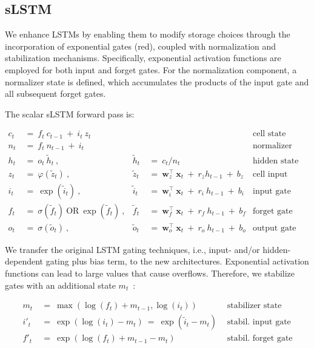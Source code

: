\subsection{sLSTM}
\label{sec:sLSTM}

We enhance LSTMs by enabling them to modify storage choices through the incorporation of exponential gates (red), coupled with normalization and stabilization mechanisms. Specifically, exponential activation functions are employed for both input and forget gates. For the normalization component, a normalizer state is defined, which accumulates the products of the input gate and all subsequent forget gates.

The scalar sLSTM forward pass is:

\begin{align}
\label{eq:slstmforward}
c_t \ &= \  f_t \ c_{t-1} \ + \ i_t \ z_t & & 
 &\text{cell state} \\
n_t \ &= \  f_t \ n_{t-1} \ + \ i_t  & & 
 &\text{normalizer state} \\
h_t \ &= \ o_t \ \tilde{h}_t \ ,
  &\tilde{h}_t \ &= \ c_t / n_t
&\text{hidden state} \\
z_t \ &= \ \varphi \left( \tilde{z}_t \right) \ , 
  &\tilde{z}_t \ &=  \ \mathbf{w}^\top_{z} \ \mathbf{x}_t \ + \
  r_{z}  h_{t-1} \ + \  b_{z}
  &\text{cell input} \\
i_t \ &= \ \!\exp \left( \tilde{i}_t  \right) \ , 
  &\tilde{i}_t \ &= \ \mathbf{w}^\top_{i} \ \mathbf{x}_t \ + \
  r_{i}  \ h_{t-1} \ + \  b_{i}
  &\text{input gate} \\
f_t \ &= \ \sigma \left(  \tilde{f}_t \right) \ \text{OR} \
\!\exp \left(  \tilde{f}_t \right) \ ,
  &\tilde{f}_t \ &= \ \mathbf{w}^\top_{f} \ \mathbf{x}_t  \ + \
  r_{f}  \ h_{t-1} \ + \  b_{f}
  &\text{forget gate} \\
o_t \ &= \ \sigma \left( \tilde{o}_t \right) \ , 
  &\tilde{o}_t  \ &= \ \mathbf{w}^\top_{o} \ \mathbf{x}_t \ + \
  r_{o}  \ h_{t-1} \ + \  b_{o}
  &\text{output gate} 
\end{align}

We transfer the original LSTM gating techniques, i.e., input- and/or hidden-dependent gating plus bias term, to the new architectures. Exponential activation functions can lead to large values that cause overflows. Therefore, we stabilize gates with an additional state \mbox{$m_t$~\citep{Milakov:18arxiv}}:

\begin{align}
\label{eq:slstmstabil}
m_t \ &= \ \max \left( \log ( f_t ) + m_{t-1} , \log ( i_t ) \right) &\text{stabilizer state} \\
i'_t \ &= \ \!\exp \left( \log \left ( i_t \right) - m_t \right) \ = \ \!\exp \left( \tilde{i}_t - m_t \right) \ \, 
  &\text{stabil. input gate} \\
f'_t \ &= \ \!\exp \left( \log \left( f_t \right) + m_{t-1} - m_t \right) \ \, 
  &\text{stabil. forget gate}
\end{align}

